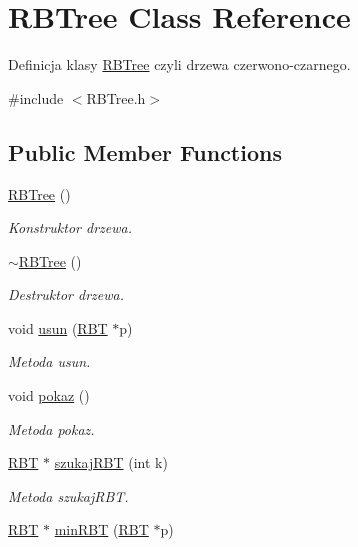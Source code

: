\hypertarget{class_r_b_tree}{\section{R\-B\-Tree Class Reference}
\label{class_r_b_tree}
}


Definicja klasy \hyperlink{class_r_b_tree}{R\-B\-Tree} czyli drzewa czerwono-\/czarnego.  




{\ttfamily \#include $<$R\-B\-Tree.\-h$>$}

\subsection*{Public Member Functions}
\begin{DoxyCompactItemize}
\item 
\hyperlink{class_r_b_tree_a19921f34f32f777bb3c4b85d4ff1d9de}{R\-B\-Tree} ()
\begin{DoxyCompactList}\small\item\em Konstruktor drzewa. \end{DoxyCompactList}\item 
\hyperlink{class_r_b_tree_abab51e54e07c1adf0ca0c9a5d466427b}{$\sim$\-R\-B\-Tree} ()
\begin{DoxyCompactList}\small\item\em Destruktor drzewa. \end{DoxyCompactList}\item 
void \hyperlink{class_r_b_tree_a1f4b6db4688c59667d2e64855a20e793}{usun} (\hyperlink{struct_r_b_t}{R\-B\-T} $\ast$p)
\begin{DoxyCompactList}\small\item\em Metoda usun. \end{DoxyCompactList}\item 
void \hyperlink{class_r_b_tree_ac63299809d5769a670ced90f4dfe39d3}{pokaz} ()
\begin{DoxyCompactList}\small\item\em Metoda pokaz. \end{DoxyCompactList}\item 
\hyperlink{struct_r_b_t}{R\-B\-T} $\ast$ \hyperlink{class_r_b_tree_aa1a67f2d3a81cab01c8aae698540519a}{szukaj\-R\-B\-T} (int k)
\begin{DoxyCompactList}\small\item\em Metoda szukaj\-R\-B\-T. \end{DoxyCompactList}\item 
\hyperlink{struct_r_b_t}{R\-B\-T} $\ast$ \hyperlink{class_r_b_tree_ae397c204a0dd96afca3f914fd20ba52a}{min\-R\-B\-T} (\hyperlink{struct_r_b_t}{R\-B\-T} $\ast$p)

\end{DoxyCompactItemize}
